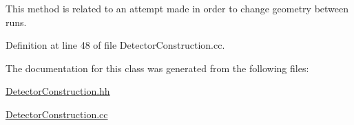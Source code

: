 This method is related to an attempt made in order to change geometry between runs. 



Definition at line 48 of file Detector\-Construction.\-cc.



The documentation for this class was generated from the following files\-:\begin{DoxyCompactItemize}
\item 
\hyperlink{_detector_construction_8hh}{Detector\-Construction.\-hh}\item 
\hyperlink{_detector_construction_8cc}{Detector\-Construction.\-cc}\end{DoxyCompactItemize}
